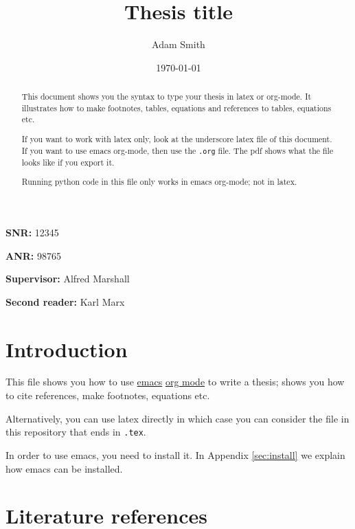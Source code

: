 \documentclass[11pt]{article}
\author{Adam Smith}
\date{\today}
\title{Thesis title}
\begin{document}
\maketitle
\begin{abstract}
This document shows you the syntax to type your thesis in latex or org-mode. It illustrates how to make footnotes, tables, equations and references to tables, equations etc.

If you want to work with latex only, look at the underscore latex file of this document. If you want to use emacs org-mode, then use the \texttt{.org} file. The pdf shows what the file looks like if you export it.

Running python code in this file only works in emacs org-mode; not in latex.
\end{abstract}


\vspace{10mm}

\textbf{SNR:} 12345

\textbf{ANR:} 98765

\vspace{10mm}
\textbf{Supervisor:} Alfred Marshall

\textbf{Second reader:} Karl Marx



\newpage



\setcounter{tocdepth}{2}
\tableofcontents

\newpage

\section{Introduction}
\label{sec:intro}

This file shows you how to use \href{https://www.gnu.org/software/emacs/}{emacs} \href{https://orgmode.org/}{org mode} to write a thesis; shows you how to cite references, make footnotes, equations etc.

Alternatively, you can use latex directly in which case you can consider the file in this repository that ends in \texttt{.tex}.

In order to use emacs, you need to install it. In Appendix \ref{sec:install} we explain how emacs can be installed.


\section{Literature references}
\end{document}
